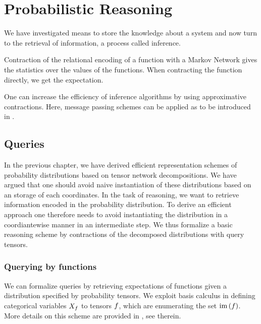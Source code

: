 \section{Probabilistic Reasoning}\label{cha:probReasoning} 

We have investigated means to store the knowledge about a system and now turn to the retrieval of information, a process called inference.

% 
Contraction of the relational encoding of a function with a Markov Network gives the statistics over the values of the functions.
When contracting the function directly, we get the expectation.

One can increase the efficiency of inference algorithms by using approximative contractions.
Here, message passing schemes can be applied as to be introduced in .


\subsection{Queries}

In the previous chapter, we have derived efficient representation schemes of probability distributions based on tensor network decompositions.
We have argued that one should avoid naive instantiation of these distributions based on an storage of each coordinates.
In the task of reasoning, we want to retrieve information encoded in the probability distribution.
To derive an efficient approach one therefore needs to avoid instantiating the distribution in a coordiantewise manner in an intermediate step.
We thus formalize a basic reasoning scheme by contractions of the decomposed distributions with query tensors.

\subsubsection{Querying by functions}

We can formalize queries by retrieving expectations of functions given a distribution specified by probability tensors. 
We exploit basis calculus in defining categorical variables $X_{f}$ to tensors $f$, which are enumerating the set $\mathrm{im}\left(f\right)$.
More details on this scheme are provided in , see  therein.

